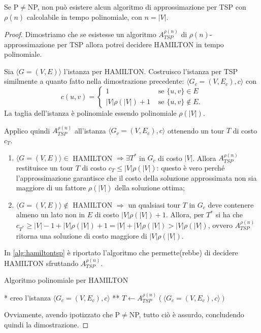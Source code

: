 \begin{teorema}
Se P$\neq$NP, non può esistere alcun algoritmo di approssimazione per TSP con $\rho(n)$ calcolabile in tempo polinomiale, con $n=|V|$.
\end{teorema}
\begin{proof}
Dimostriamo che se esistesse un algoritmo $A^{\rho(n)}_{TSP}$ di $\rho(n)$-approssimazione per TSP allora potrei decidere HAMILTON in tempo polinomiale.

Sia $\langle G=(V,E) \rangle$ l'istanza per HAMILTON. Costruisco l'istanza per TSP similmente a quanto fatto nella dimostrazione precedente: $\langle G_c=(V,E_c), c \rangle$ con
\[
c(u,v)=
\begin{cases}
1 &\mbox{ se } \{u,v\} \in E \\
|V|\rho(|V|)+1 &\mbox{ se } \{u,v\} \notin E.
\end{cases}
\]
La taglia dell'istanza è polinomiale essendo polinomiale $\rho(|V|)$.

Applico quindi $A^{\rho(n)}_{TSP}$ all'istanza $\langle G_c=(V,E_c), c \rangle$ ottenendo un tour $T$ di costo $c_T$.
\begin{enumerate}
\item $\langle G=(V,E) \rangle \in$ HAMILTON $\Rightarrow \exists T^*$ in $G_c$ di costo $|V|$. Allora $A^{\rho(n)}_{TSP}$ restituisce un tour $T$ di costo $c_T \leq |V|\rho(|V|)$: questo è vero perché l'approssimazione garantisce che il costo della soluzione approssimata non sia maggiore di un fattore $\rho(|V|)$ della soluzione ottima;
\item $\langle G=(V,E) \rangle \notin$ HAMILTON $\Rightarrow$ un qualsiasi tour $T$ in $G_c$ deve contenere almeno un lato non in $E$ di costo $|V|\rho(|V|)+1$. Allora, per $T^*$ si ha che $c_{T^*} \geq |V|-1+|V|\rho(|V|)+1 = |V| + |V|\rho(|V|) > |V|\rho(|V|)$, ovvero $A^{\rho(n)}_{TSP}$ ritorna una soluzione di costo maggiore di $|V|\rho(|V|)$.
\end{enumerate}

In \ref{alg:hamiltontsp} è riportato l'algoritmo che permette(rebbe) di decidere HAMILTON sfruttando $A^{\rho(n)}_{TSP}$.
\begin{algorithm}
\caption{Algoritmo polinomiale per HAMILTON}
\label{alg:hamiltontsp}
\begin{algorithmic}
	\State ** creo l'istanza $\langle G_c = (V,E_c), c \rangle$ **
	\State $T \gets A^{\rho(n)}_{TSP}(\langle G_c = (V,E_c), c \rangle)$
		\State {}
	\Else
		\State {}
	\EndIf
\EndFunction
\end{algorithmic}
\end{algorithm}

Ovviamente, avendo ipotizzato che P$\neq$NP, tutto ciò è assurdo, concludendo quindi la dimostrazione.
\end{proof}

